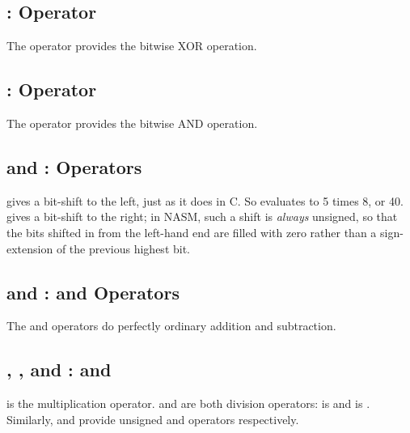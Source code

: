 \subsection{\codeindex{\textasciicircum}:  Operator}
\label{subsec:expxor}

The \code{\textasciicircum} operator provides the bitwise XOR operation.

\subsection{\codeindex{\&}:  Operator}
\label{subsec:expand}

The \code{\&} operator provides the bitwise AND operation.

\subsection{\codeindex{<<} and \codeindex{>>}:  Operators}
\label{subsec:expshift}

\code{<<} gives a bit-shift to the left, just as it does in C.
So  evaluates to 5 times 8, or 40. \code{>>} gives
a bit-shift to the right; in NASM, such a shift is \emph{always}
unsigned, so that the bits shifted in from the left-hand end
are filled with zero rather than a sign-extension of the
previous highest bit.

\subsection{\codeindex{+} and \codeindex{-}:
 and  Operators}
\label{subsec:expplmi}

The \code{+} and \code{-} operators do perfectly ordinary addition
and subtraction.

\subsection{\codeindex{*}, \codeindex{/}, \codeindex{//} and \codeindex{\%\%}:
 and }
\label{subsec:expmul}

\code{*} is the multiplication operator. \code{/} and \code{//} are both
division operators: \code{/} is  and
\code{//} is . Similarly, \code{\%} and
\code{\%\%} provide unsigned
and  operators respectively.

